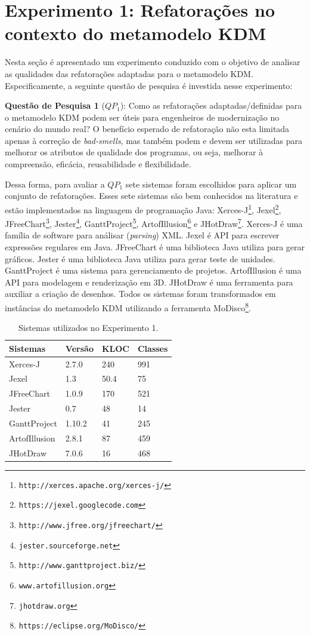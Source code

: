 \section{Experimento 1: Refatorações no contexto do metamodelo KDM}\label{sec:experimento}

Nesta seção é apresentado um experimento conduzido com o objetivo de analisar as qualidades das refatorações adaptadas para o metamodelo KDM. Especificamente, a seguinte questão de pesquisa é investida nesse experimento:

\textbf{Questão de Pesquisa 1} (\textbf{$QP_1$}): Como as refatorações adaptadas/definidas para o metamodelo KDM podem ser úteis para engenheiros de modernização no cenário do mundo real? O benefício esperado de refatoração não esta limitada apenas à correção de \textit{bad-smells}, mas também podem e devem ser utilizadas para melhorar os atributos de qualidade dos programas, ou seja, melhorar à compreensão, eficácia, reusabilidade e flexibilidade.


Dessa forma, para avaliar a \textbf{$QP_1$} sete sistemas foram escolhidos para aplicar um conjunto de refatorações. Esses sete sistemas são bem conhecidos na literatura e estão implementados na linguagem de programação Java: Xerces-J\footnote{\texttt{http://xerces.apache.org/xerces-j/}}, Jexel\footnote{\texttt{https://jexel.googlecode.com}}, JFreeChart\footnote{\texttt{http://www.jfree.org/jfreechart/}}, Jester\footnote{\texttt{jester.sourceforge.net}}, GanttProject\footnote{\texttt{http://www.ganttproject.biz/}}, ArtofIllusion\footnote{\texttt{www.artofillusion.org}} e JHotDraw\footnote{\texttt{jhotdraw.org}}. Xerces-J é uma família de software para análisar (\textit{parsing}) XML. Jexel é API para escrever expressões regulares em Java. JFreeChart é uma biblioteca Java utiliza para gerar gráficos. Jester é uma biblioteca Java utiliza para gerar teste de unidades. GanttProject é uma sistema para gerenciamento de projetos. ArtofIllusion é uma API para modelagem e renderização em 3D. JHotDraw é uma ferramenta para auxiliar a criação de desenhos. Todos os sistemas foram transformados em instâncias do metamodelo KDM utilizando a ferramenta MoDisco\footnote{\texttt{https://eclipse.org/MoDisco/}}. 


\begin{table}[h]
\centering
\caption{Sistemas utilizados no Experimento 1.}
\label{tab:sistemas_experimentos}
\begin{tabular}{ | m{2cm} | m{1cm}| m{1cm} | m{1cm} | } 
\hline
Sistemas & Versão & KLOC & Classes \\ 
\hline
Xerces-J & 2.7.0 & 240 & 991\\ 
\hline
Jexel & 1.3 & 50.4 & 75\\
\hline
JFreeChart & 1.0.9 & 170 & 521\\ 
\hline
Jester & 0.7 & 48 & 14\\ 
\hline
GanttProject & 1.10.2 & 41 & 245\\ 
\hline
ArtofIllusion & 2.8.1 & 87 & 459\\ 
\hline
JHotDraw & 7.0.6 & 16 & 468 \\ 
\hline
\end{tabular}
\end{table}

